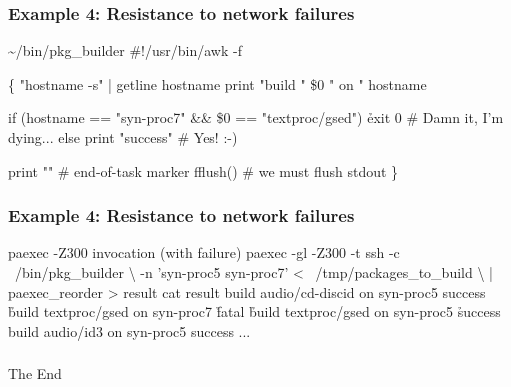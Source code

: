 \documentclass[hyperref={colorlinks=true}]{beamer}
\begin{document}
\begin{frame}[fragile]
  \frametitle{Example 4: Resistance to network failures}

  \begin{block}{}
      \begin{CodeSmall}{\~{}/bin/pkg\_builder}
#!/usr/bin/awk -f

\{
   "hostname -s" | getline hostname
   print "build " \$0 " on " hostname

   if (hostname == "syn-proc7" && \$0 == "textproc/gsed")
      \h{exit 0} # Damn it, I'm dying...
   else
      print "success" # Yes! :-)

   print ""        # end-of-task marker
   fflush()        # we must flush stdout
\}
      \end{CodeSmall}
  \end{block}
\end{frame}

\begin{frame}[fragile]
  \frametitle{Example 4: Resistance to network failures}

  \begin{block}{}
      \begin{CodeSmall}{paexec -Z300 invocation (with failure)}
\prompt{\$} paexec -gl -Z300 -t ssh -c ~/bin/pkg_builder \textbackslash
      -n 'syn-proc5 syn-proc7' < ~/tmp/packages_to_build \textbackslash
      | paexec_reorder > result
\prompt{\$} cat result
build audio/cd-discid on syn-proc5
success
\h{build textproc/gsed on syn-proc7}
\h{fatal}
\h{build textproc/gsed on syn-proc5}
\h{success}
build audio/id3 on syn-proc5
success
...
\prompt{\$}
      \end{CodeSmall}
  \end{block}
\end{frame}

\begin{frame}[fragile]
  \frametitle{}
  \begin{center}
    \huge
    The End
  \end{center}
\end{frame}

\end{document}
